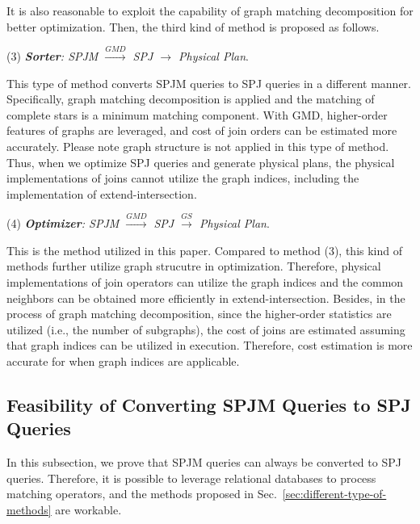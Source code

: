 It is also reasonable to exploit the capability of graph matching decomposition for better optimization.
Then, the third kind of method is proposed as follows.

(3) \emph{\textbf{Sorter}: SPJM $\xrightarrow{GMD}$ SPJ $\rightarrow$ Physical Plan}.

This type of method converts SPJM queries to SPJ queries in a different manner.
Specifically, graph matching decomposition is applied and the matching of complete stars is a minimum matching component.
With GMD, higher-order features of graphs are leveraged, and cost of join orders can be estimated more accurately.
Please note graph structure is not applied in this type of method.
Thus, when we optimize SPJ queries and generate physical plans, the physical implementations of joins cannot utilize the graph indices, including the implementation of extend-intersection.


(4) \emph{\textbf{Optimizer}: SPJM $\xrightarrow{GMD}$ SPJ $\xrightarrow{GS}$ Physical Plan}.

This is the method utilized in this paper.
Compared to method (3), this kind of methods further utilize graph strucutre in optimization.
Therefore, physical implementations of join operators can utilize the graph indices and the common neighbors can be obtained more efficiently in extend-intersection.
Besides, in the process of graph matching decomposition, since the higher-order statistics are utilized (i.e., the number of subgraphs), the cost of joins are estimated assuming that graph indices can be utilized in execution.
Therefore, cost estimation is more accurate for when graph indices are applicable. 

\subsection{Feasibility of Converting SPJM Queries to SPJ Queries}
In this subsection, we prove that SPJM queries can always be converted to SPJ queries.
Therefore, it is possible to leverage relational databases to process matching operators, and the methods proposed in Sec.~\ref{sec:different-type-of-methods} are workable. 

